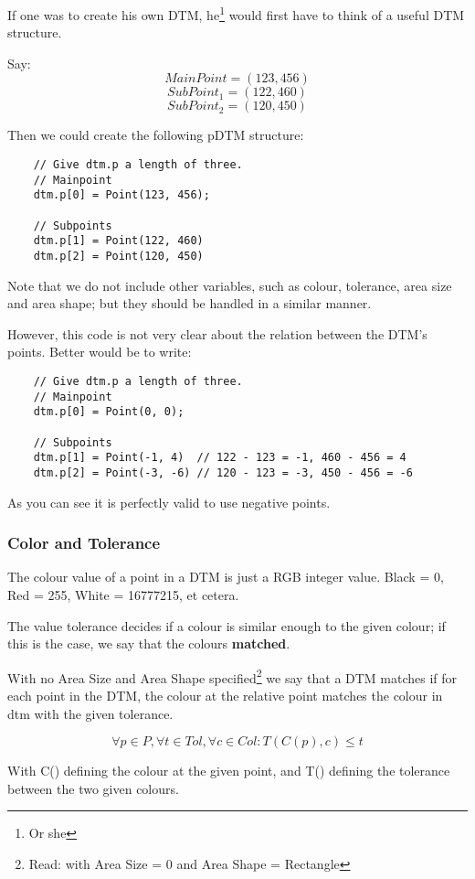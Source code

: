 \documentclass[a4paper, 10pt]{report} %
\begin{document}
If one was to create his own DTM, he\footnote{Or she} would first have to
think of a useful DTM structure.

Say:
$$ MainPoint = (123, 456)  $$
$$ SubPoint_1 = (122, 460) $$
$$ SubPoint_2 = (120, 450) $$

Then we could create the following pDTM structure:

\begin{verbatim}
	// Give dtm.p a length of three.
	// Mainpoint
	dtm.p[0] = Point(123, 456);

	// Subpoints
	dtm.p[1] = Point(122, 460)
	dtm.p[2] = Point(120, 450)
\end{verbatim}

Note that we do not include other variables, such as colour, tolerance, area
size and area shape; but they should be handled in a similar manner.

However, this code is not very clear about the relation between the DTM's
 points. Better would be to write:

\begin{verbatim}
    // Give dtm.p a length of three.
    // Mainpoint
    dtm.p[0] = Point(0, 0);

    // Subpoints
    dtm.p[1] = Point(-1, 4)  // 122 - 123 = -1, 460 - 456 = 4
    dtm.p[2] = Point(-3, -6) // 120 - 123 = -3, 450 - 456 = -6
\end{verbatim}

As you can see it is perfectly valid to use negative points.

\subsubsection{Color and Tolerance}

The colour value of a point in a DTM is just a RGB integer value.
Black = 0, Red = 255, White = 16777215, et cetera.

The value tolerance decides if a colour is similar enough to the given
colour; if this is the case, we say that the colours \textbf{matched}.

With no Area Size and Area Shape specified\footnote{Read: with Area
Size = 0 and Area Shape = Rectangle} we say that a DTM matches if for each
point in the DTM, the colour at the relative point matches the colour in dtm
with the given tolerance.

$$ \forall p \in P, \forall t \in Tol, \forall c \in Col : T(C(p), c) \leq t
 $$

With C() defining the colour at the given point, and T() defining the tolerance
between the two given colours.
\end{document}
